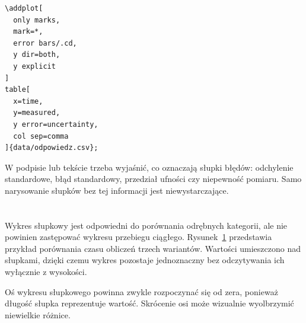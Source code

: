 \begin{lstlisting}[caption={\ploren{Słupki błędów z wartości zapisanych w CSV}{Error bars from values stored in CSV}}]
\addplot[
  only marks,
  mark=*,
  error bars/.cd,
  y dir=both,
  y explicit
]
table[
  x=time,
  y=measured,
  y error=uncertainty,
  col sep=comma
]{data/odpowiedz.csv};
\end{lstlisting}

W podpisie lub tekście trzeba wyjaśnić, co oznaczają słupki błędów: odchylenie standardowe, błąd standardowy, przedział ufności czy niepewność pomiaru. Samo narysowanie słupków bez tej informacji jest niewystarczające.

\section{}

Wykres słupkowy jest odpowiedni do porównania odrębnych kategorii, ale nie powinien zastępować wykresu przebiegu ciągłego. Rysunek~\ref{fig:wykres-slupkowy} przedstawia przykład porównania czasu obliczeń trzech wariantów. Wartości umieszczono nad słupkami, dzięki czemu wykres pozostaje jednoznaczny bez odczytywania ich wyłącznie z wysokości.

\begin{figure}[htbp]
  \centering
  \caption{}
  \label{fig:wykres-slupkowy}
\end{figure}

Oś wykresu słupkowego powinna zwykle rozpoczynać się od zera, ponieważ długość słupka reprezentuje wartość. Skrócenie osi może wizualnie wyolbrzymić niewielkie różnice.

\section{}

